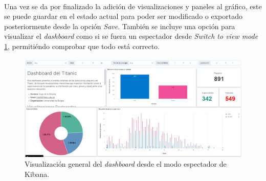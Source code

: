 \paragraph{}
\paragraph{}


Una vez se da por finalizado la adición de visualizaciones y paneles al gráfico, este se puede guardar en el estado actual para poder ser modificado o exportado posteriormente desde la opción \textit{Save}. También se incluye una opción para visualizar el \textit{dashboard} como si se fuera un espectador desde \textit{Switch to view mode} \ref{fig:kibana19}, permitiéndo comprobar que todo está correcto.

\begin{figure}
    \centering
    \includegraphics[width=1\linewidth]{img/kibana19.png}
    \caption{Visualización general del \textit{dashboard} desde el modo espectador de Kibana.}
    \label{fig:kibana19}
\end{figure}
